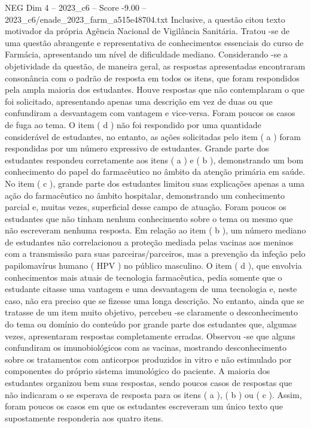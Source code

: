 \begin{textsample}{NEG Dim 4 – 2023\_c6 – Score -9.00 – 2023\_c6/enade\_2023\_farm\_a515e48704.txt}
Inclusive, a questão citou texto motivador da própria Agência Nacional de Vigilância Sanitária.
Tratou -se de uma questão abrangente e representativa de conhecimentos essenciais do curso de Farmácia, apresentando um nível de dificuldade mediano.
Considerando -se a objetividade da questão, de maneira geral, as respostas apresentadas encontraram consonância com o padrão de resposta em todos os itens, que foram respondidos pela ampla maioria dos estudantes.
Houve respostas que não contemplaram o que foi solicitado, apresentando apenas uma descrição em vez de duas ou que confundiram a desvantagem com vantagem e vice-versa.
Foram poucos os casos de fuga ao tema.
O item ( d ) não foi respondido por uma quantidade considerável de estudantes, no entanto, as ações solicitadas pelo item ( a ) foram respondidas por um número expressivo de estudantes.
Grande parte dos estudantes respondeu corretamente aos itens ( a ) e ( b ), demonstrando um bom conhecimento do papel do farmacêutico no âmbito da atenção primária em saúde.
No item ( c ), grande parte dos estudantes limitou suas explicações apenas a uma ação do farmacêutico no âmbito hospitalar, demonstrando um conhecimento parcial e, muitas vezes, superficial desse campo de atuação.
Foram poucos os estudantes que não tinham nenhum conhecimento sobre o tema ou mesmo que não escreveram nenhuma resposta.
Em relação ao item ( b ), um número mediano de estudantes não correlacionou a proteção mediada pelas vacinas aos meninos com a transmissão para suas parceiras/parceiros, mas a prevenção da infeção pelo papilomavírus humano ( HPV ) no público masculino.
O item ( d ), que envolvia conhecimentos mais atuais de tecnologia farmacêutica, pedia somente que o estudante citasse uma vantagem e uma desvantagem de uma tecnologia e, neste caso, não era preciso que se fizesse uma longa descrição.
No entanto, ainda que se tratasse de um item muito objetivo, percebeu -se claramente o desconhecimento do tema ou domínio do conteúdo por grande parte dos estudantes que, algumas vezes, apresentaram respostas completamente erradas.
Observou -se que alguns confundiram os imunobiológicos com as vacinas, mostrando desconhecimento sobre os tratamentos com anticorpos produzidos in vitro e não estimulado por componentes do próprio sistema imunológico do paciente.
A maioria dos estudantes organizou bem suas respostas, sendo poucos casos de respostas que não indicaram o se esperava de resposta para os itens ( a ), ( b ) ou ( c ).
Assim, foram poucos os casos em que os estudantes escreveram um único texto que supostamente responderia aos quatro itens.

\end{textsample}
